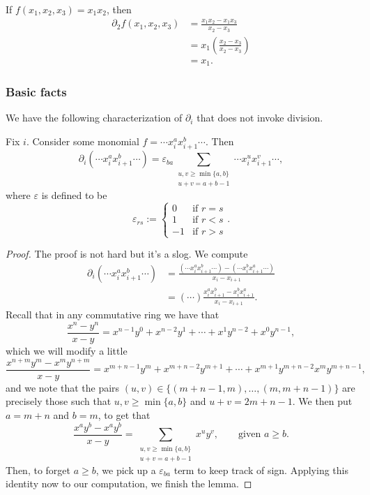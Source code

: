 \documentclass{article}
\begin{document}
\begin{example}
    If $f(x_1, x_2, x_3) = x_1x_2$, then
    \begin{align*}
        \partial_2 f(x_1,x_2,x_3) &= \frac{x_1x_2 - x_1x_3}{x_2 - x_3} \\
                                  &= x_1\left(\frac{x_2-x_3}{x_2-x_3}\right) \\
                                  &= x_1.
    \end{align*}
\end{example}

\subsubsection{Basic facts}

We have the following characterization of $\partial_i$ that does not invoke division.

\begin{lemma}
    Fix $i$. Consider some monomial $f = \cdots x_i^ax_{i+1}^b \cdots$. Then
    \[
        \partial_i(\cdots x_i^a x_{i+1}^b \cdots) = 
        \varepsilon_{ba}
        \sum_{\substack{u,v \geq \min\{a,b\} \\ u+v = a+b-1}} \cdots x_i^u x_{i+1}^v \cdots,
    \]
    where $\varepsilon$ is defined to be
    \[
        \varepsilon_{rs} := \begin{cases}
            0 & \text{if } r = s \\
            1 & \text{if } r < s \\
            -1 & \text{if }r > s 
        \end{cases}.
    \]
\end{lemma}

\begin{proof}
    The proof is not hard but it's a slog. We compute
    \begin{align*}
        \partial_i(\cdots x_i^a x_{i+1}^b \cdots) &= \frac{(\cdots x_i^a x_{i+1}^b \cdots) - (\cdots x_i^b x_{i+1}^a \cdots)}{x_i-x_{i+1}} \\
                                                                          &= (\cdots) \frac{x_i^ax_{i+1}^b - x_i^bx_{i+1}^a}{x_i-x_{i+1}}.
    \end{align*}
    Recall that in any commutative ring we have that
    \[
        \frac{x^n-y^n}{x-y} = x^{n-1}y^0 + x^{n-2}y^1 + \cdots + x^1y^{n-2} + x^0y^{n-1},
    \]
    which we will modify a little
    \[
        \frac{x^{n+m}y^m-x^my^{n+m}}{x-y} = x^{m+n-1}y^m + x^{m+n-2}y^{m+1} + \cdots + x^{m+1}y^{m+n-2}x^my^{m+n-1},
    \]
    and we note that the pairs $(u,v) \in \{(m+n-1,m),\ldots,(m,m+n-1)\}$ are precisely those such that $u,v \geq \min\{a,b\}$ and $u+v = 2m+n-1$. We then put $a=m+n$ and $b=m$, to get that
    \[
        \frac{x^ay^b-x^ay^b}{x-y} = \sum_{\substack{u,v \geq \min\{a,b\}\\u+v=a+b-1}} x^uy^v, \qquad \text{given }a \geq b.
    \]
    Then, to forget $a \geq b$, we pick up a $\varepsilon_{ba}$ term to keep track of sign. 
    Applying this identity now to our computation, we finish the lemma.
\end{proof}
\end{document}
